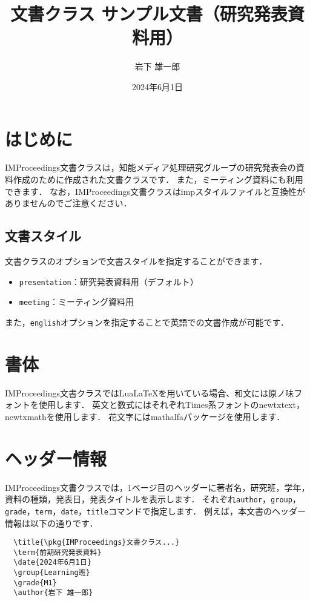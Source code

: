 \documentclass[lualatex,presentation]{improceedings}
\title{\pkg{IMProceedings}文書クラス サンプル文書（研究発表資料用）}
\date{2024年6月1日}
\author{岩下 雄一郎}
\newcommand{\pkg}[1]{\textsf{#1}}
\newcommand{\code}[1]{\texttt{#1}}
\begin{document}
\maketitle

\section{はじめに}

\pkg{IMProceedings}文書クラスは，知能メディア処理研究グループの研究発表会の資料作成のために作成された文書クラスです．
また，ミーティング資料にも利用できます．
なお，\pkg{IMProceedings}文書クラスは\pkg{imp}スタイルファイルと互換性がありませんのでご注意ください．

\subsection{文書スタイル}

文書クラスのオプションで文書スタイルを指定することができます．
\begin{itemize}
  \item \code{presentation}：研究発表資料用（デフォルト）
  \item \code{meeting}：ミーティング資料用
\end{itemize}
また，\code{english}オプションを指定することで英語での文書作成が可能です．

\section{書体}

\pkg{IMProceedings}文書クラスではLuaLaTeXを用いている場合、和文には原ノ味フォントを使用します．
英文と数式にはそれぞれTimes系フォントの\pkg{newtxtext}，\pkg{newtxmath}を使用します．
花文字には\pkg{mathalfa}パッケージを使用します．

\section{ヘッダー情報}

\pkg{IMProceedings}文書クラスでは，1ページ目のヘッダーに著者名，研究班，学年，資料の種類，発表日，発表タイトルを表示します．
それぞれ\code{author}，\code{group}，\code{grade}，\code{term}，\code{date}，\code{title}コマンドで指定します．
例えば，本文書のヘッダー情報は以下の通りです．
\begin{verbatim}
  \title{\pkg{IMProceedings}文書クラス...}
  \term{前期研究発表資料}
  \date{2024年6月1日}
  \group{Learning班}
  \grade{M1}
  \author{岩下 雄一郎}
\end{verbatim}
\end{document}
